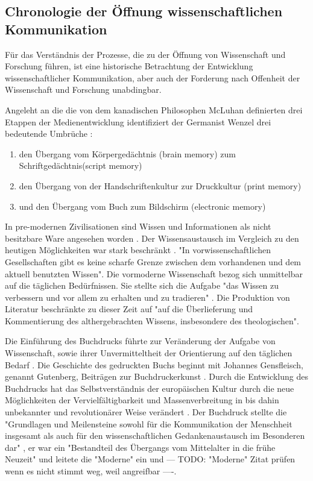 \subsection{Chronologie der Öffnung wissenschaftlichen Kommunikation}
Für das Verständnis der Prozesse, die zu der Öffnung von Wissenschaft und Forschung führen, ist eine historische Betrachtung der Entwicklung wissenschaftlicher Kommunikation, aber auch der Forderung nach Offenheit der Wissenschaft und Forschung unabdingbar. 

Angeleht an die die von dem kanadischen Philosophen McLuhan definierten drei Etappen der Medienentwicklung \cite{wunderlich_2008_buchdruck} identifiziert der Germanist Wenzel drei bedeutende Umbrüche \cite{wenzel_mediengeschichte_2007}: 
\begin{enumerate}
\item den Übergang vom Körpergedächtnis (brain memory) zum Schriftgedächtnis(script memory)
\item den Übergang von der Handschriftenkultur zur Druckkultur (print memory)
\item und den Übergang vom Buch zum Bildschirm (electronic memory)
\end{enumerate}

In pre-modernen Zivilisationen sind Wissen und Informationen als nicht besitzbare Ware angesehen worden\cite{cite:18} \cite{steiner_1998_autorenhonorar}. Der Wissensaustausch im Vergleich zu den heutigen Möglichkeiten war stark beschränkt \cite{cite:17c}. "In vorwissenschaftlichen Gesellschaften gibt es keine scharfe Grenze zwischen dem vorhandenen und dem aktuell benutzten Wissen"\cite{Luhmann1998}. Die vormoderne Wissenschaft bezog sich unmittelbar auf die täglichen Bedürfnissen. Sie stellte sich die Aufgabe "das Wissen zu verbessern und vor allem zu erhalten und zu tradieren" \cite{Luhmann1998}. Die Produktion von Literatur beschränkte zu dieser Zeit auf "auf die Überlieferung und Kommentierung des althergebrachten Wissens, insbesondere des theologischen"\cite{steiner_1998_autorenhonorar}.

Die Einführung des Buchdrucks führte zur Veränderung der Aufgabe von Wissenschaft, sowie ihrer Unvermitteltheit der Orientierung auf den täglichen Bedarf \cite{Luhmann1998}. Die Geschichte des gedruckten Buchs beginnt mit Johannes Gensfleisch, genannt Gutenberg, Beiträgen zur Buchdruckerkunst \cite{wittmann_1999_geschichte}. Durch die Entwicklung des Buchdrucks hat das Selbstverständnis der europäischen Kultur durch die neue Möglichkeiten der Vervielfältigbarkeit und Massenverbreitung in bis dahin unbekannter \cite{giesecke_1991_buchdruck} und revolutionärer Weise verändert \cite{wunderlich_2008_buchdruck}. Der Buchdruck stellte die "Grundlagen und Meilensteine sowohl für die Kommunikation der Menschheit insgesamt als auch für den wissenschaftlichen Gedankenaustausch im Besonderen dar" \cite{schirmbacher_2009_wisspub}, er war ein "Bestandteil des Übergangs vom Mittelalter in die frühe Neuzeit" \cite{lange2008medienwettbewerb} und leitete die "Moderne" ein \cite{luhmann_1997_gesellschaft} und  --- TODO: "Moderne" Zitat prüfen wenn es nicht stimmt weg, weil angreifbar ----. 

